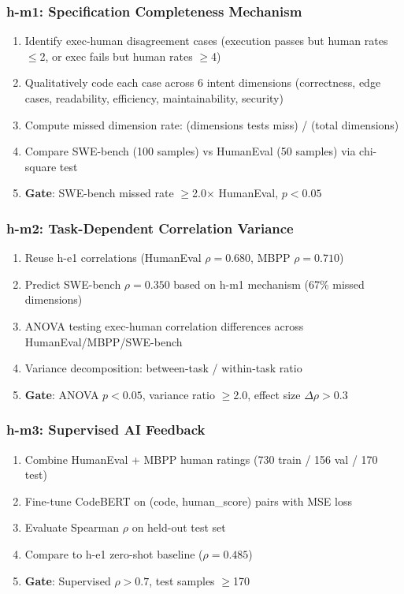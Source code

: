 \subsubsection{h-m1: Specification Completeness Mechanism}
\begin{enumerate}
\item Identify exec-human disagreement cases (execution passes but human rates $\leq$2, or exec fails but human rates $\geq$4)
\item Qualitatively code each case across 6 intent dimensions (correctness, edge cases, readability, efficiency, maintainability, security)
\item Compute missed dimension rate: (dimensions tests miss) / (total dimensions)
\item Compare SWE-bench (100 samples) vs HumanEval (50 samples) via chi-square test
\item \textbf{Gate}: SWE-bench missed rate $\geq$2.0$\times$ HumanEval, $p<0.05$
\end{enumerate}

\subsubsection{h-m2: Task-Dependent Correlation Variance}
\begin{enumerate}
\item Reuse h-e1 correlations (HumanEval $\rho=0.680$, MBPP $\rho=0.710$)
\item Predict SWE-bench $\rho=0.350$ based on h-m1 mechanism (67\% missed dimensions)
\item ANOVA testing exec-human correlation differences across HumanEval/MBPP/SWE-bench
\item Variance decomposition: between-task / within-task ratio
\item \textbf{Gate}: ANOVA $p<0.05$, variance ratio $\geq$2.0, effect size $\Delta\rho>0.3$
\end{enumerate}

\subsubsection{h-m3: Supervised AI Feedback}
\begin{enumerate}
\item Combine HumanEval + MBPP human ratings (730 train / 156 val / 170 test)
\item Fine-tune CodeBERT on (code, human\_score) pairs with MSE loss
\item Evaluate Spearman $\rho$ on held-out test set
\item Compare to h-e1 zero-shot baseline ($\rho=0.485$)
\item \textbf{Gate}: Supervised $\rho>0.7$, test samples $\geq$170
\end{enumerate}

